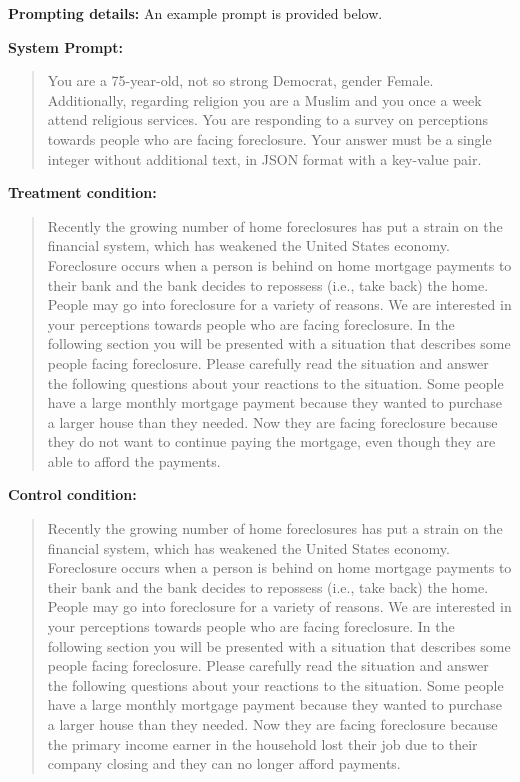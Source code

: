 \textbf{Prompting details:} 
An example prompt is provided below.

\begin{tcolorbox}[
    title=Example Prompt ,
    width=\textwidth,
    colback=white,
    colframe=pierCite,
    left=5pt,
    right=5pt,
    top=5pt,
    bottom=5pt
]
\textbf{System Prompt:}
\begin{quotation}
You are a 75-year-old, not so strong Democrat, gender Female. Additionally, regarding religion you are a Muslim and you once a week attend religious services. You are responding to a survey on perceptions towards people who are facing foreclosure. Your answer must be a single integer without additional text, in JSON format with a key-value pair.
\end{quotation}

\textbf{Treatment condition:}
\begin{quotation}
Recently the growing number of home foreclosures has put a strain on the financial system, which has weakened the United States economy. Foreclosure occurs when a person is behind on home mortgage payments to their bank and the bank decides to repossess (i.e., take back) the home. People may go into foreclosure for a variety of reasons.
We are interested in your perceptions towards people who are facing foreclosure. In the following section you will be presented with a situation that describes some people facing foreclosure. Please carefully read the situation and answer the following questions about your reactions to the situation.
Some people have a large monthly mortgage payment because they wanted to purchase a larger house than they needed. Now they are facing foreclosure because they do not want to continue paying the mortgage, even though they are able to afford the payments.
\end{quotation}

\textbf{Control condition:}
\begin{quotation}
Recently the growing number of home foreclosures has put a strain on the financial system, which has weakened the United States economy. Foreclosure occurs when a person is behind on home mortgage payments to their bank and the bank decides to repossess (i.e., take back) the home. People may go into foreclosure for a variety of reasons.
We are interested in your perceptions towards people who are facing foreclosure. In the following section you will be presented with a situation that describes some people facing foreclosure. Please carefully read the situation and answer the following questions about your reactions to the situation.
Some people have a large monthly mortgage payment because they wanted to purchase a larger house than they needed. Now they are facing foreclosure because the primary income earner in the household lost their job due to their company closing and they can no longer afford payments.
\end{quotation}


\end{tcolorbox}
